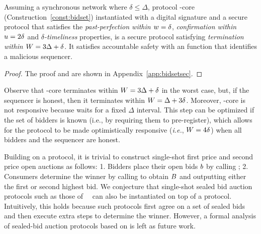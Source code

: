 \begin{theorem}\label{thm:bidset-construction-secure}
Assuming a synchronous network where $\delta \leq \Delta$,
protocol \bidsettm-core (Construction~\ref{const:bidset}) instantiated with a digital signature and a  secure \podtm protocol that satisfies the \emph{past-perfection within $w = \delta$}, \emph{confirmation within $u=2\delta$} and \emph{$\delta$-timeliness} properties, is a secure \bidsettm protocol satisfying \emph{termination within $W = 3\Delta + \delta$}.
It satisfies accountable safety with an \identifySequencer{} function that identifies a malicious sequencer.
\end{theorem}
\vspace{-3mm}
\begin{proof} The proof and \identifySequencer{} are shown in Appendix~\ref{app:bidsetsec}.
\end{proof}

\begin{remark}
    Observe that \bidsettm-core terminates within $W = 3\Delta + \delta$ in the worst case, but, if the sequencer is honest, then it terminates within $W = \Delta + 3\delta$.
    Moreover, \bidsettm-core is not responsive because  waits for a fixed $\Delta$ interval.
    This step can be optimized if the set of bidders is known (i.e., by requiring them to pre-register), which allows for the protocol to be made optimistically responsive (\textit{i.e.}, $W = 4\delta$) when all bidders and the sequencer are honest.
\end{remark}
\vspace{-2mm}
 Building on a \bidsettm protocol, it is trivial to construct single-shot first price and second price open auctions as follows: 1. Bidders place their open bids $b$ by calling \opSubmitBid{\bid}; 2. Consumers determine the winner by calling \opReadResult{} to obtain $B$ and outputting either the first or second highest bid. We conjecture that single-shot sealed bid auction protocols such as those of~~\cite{trustee,seal,ACNS:DavGenPou22,CCS:TAFWBM23,chitra_et_al:LIPIcs.AFT.2024.19,cryptoeprint:2024/1011} can also be instantiated on top of a \bidsettm protocol. Intuitively, this holds because such protocols first agree on a set of sealed bids and then execute extra steps to determine the winner. However, a formal analysis of sealed-bid auction protocols based on \bidsettm is left as future work.